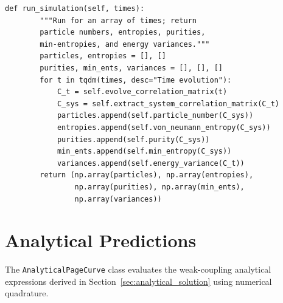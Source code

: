 \documentclass[12pt,oneside,openright]{report}
\theoremstyle{definition}
\theoremstyle{plain}
\theoremstyle{remark}
\begin{document}
\begin{lstlisting}[caption={Core simulation class for the fermionic Page curve model.}]
    def run_simulation(self, times):
        """Run for an array of times; return
        particle numbers, entropies, purities,
        min-entropies, and energy variances."""
        particles, entropies = [], []
        purities, min_ents, variances = [], [], []
        for t in tqdm(times, desc="Time evolution"):
            C_t = self.evolve_correlation_matrix(t)
            C_sys = self.extract_system_correlation_matrix(C_t)
            particles.append(self.particle_number(C_sys))
            entropies.append(self.von_neumann_entropy(C_sys))
            purities.append(self.purity(C_sys))
            min_ents.append(self.min_entropy(C_sys))
            variances.append(self.energy_variance(C_t))
        return (np.array(particles), np.array(entropies),
                np.array(purities), np.array(min_ents),
                np.array(variances))
\end{lstlisting}

\section{Analytical Predictions}
\label{app:code:analytical}

The \texttt{AnalyticalPageCurve} class evaluates the weak-coupling analytical expressions derived in Section~\ref{sec:analytical_solution} using numerical quadrature.
\end{document}
